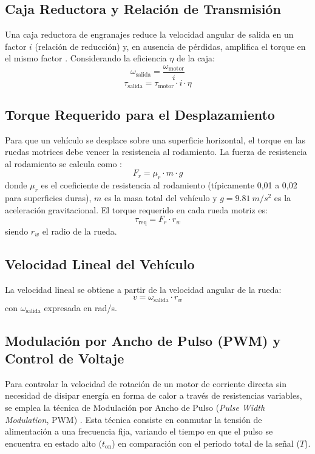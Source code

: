 \documentclass[conference]{IEEEtran}
\begin{document}
\subsection{Caja Reductora y Relación de Transmisión}
Una caja reductora de engranajes reduce la velocidad angular de salida en un factor $i$ (relación de reducción) y, en ausencia de pérdidas, amplifica el torque en el mismo factor \cite{shigley}. Considerando la eficiencia $\eta$ de la caja:
\begin{equation}
\omega_{\text{salida}} = \frac{\omega_{\text{motor}}}{i}
\end{equation}
\begin{equation}
\tau_{\text{salida}} = \tau_{\text{motor}} \cdot i \cdot \eta
\end{equation}

\subsection{Torque Requerido para el Desplazamiento}
Para que un vehículo se desplace sobre una superficie horizontal, el torque en las ruedas motrices debe vencer la resistencia al rodamiento. La fuerza de resistencia al rodamiento se calcula como \cite{gillespie}:
\begin{equation}
F_r = \mu_r \cdot m \cdot g
\end{equation}
donde $\mu_r$ es el coeficiente de resistencia al rodamiento (típicamente 0,01 a 0,02 para superficies duras), $m$ es la masa total del vehículo y $g = \SI{9.81}{m/s^2}$ es la aceleración gravitacional. El torque requerido en cada rueda motriz es:
\begin{equation}
\tau_{\text{req}} = F_r \cdot r_w
\end{equation}
siendo $r_w$ el radio de la rueda.

\subsection{Velocidad Lineal del Vehículo}
La velocidad lineal se obtiene a partir de la velocidad angular de la rueda:
\begin{equation}
v = \omega_{\text{salida}} \cdot r_w
\end{equation}
con $\omega_{\text{salida}}$ expresada en rad/s.

\subsection{Modulación por Ancho de Pulso (PWM) y Control de Voltaje}
Para controlar la velocidad de rotación de un motor de corriente directa sin necesidad de disipar energía en forma de calor a través de resistencias variables, se emplea la técnica de Modulación por Ancho de Pulso (\emph{Pulse Width Modulation}, PWM) \cite{chapman}. Esta técnica consiste en conmutar la tensión de alimentación a una frecuencia fija, variando el tiempo en que el pulso se encuentra en estado alto ($t_{\text{on}}$) en comparación con el periodo total de la señal ($T$).
\end{document}
